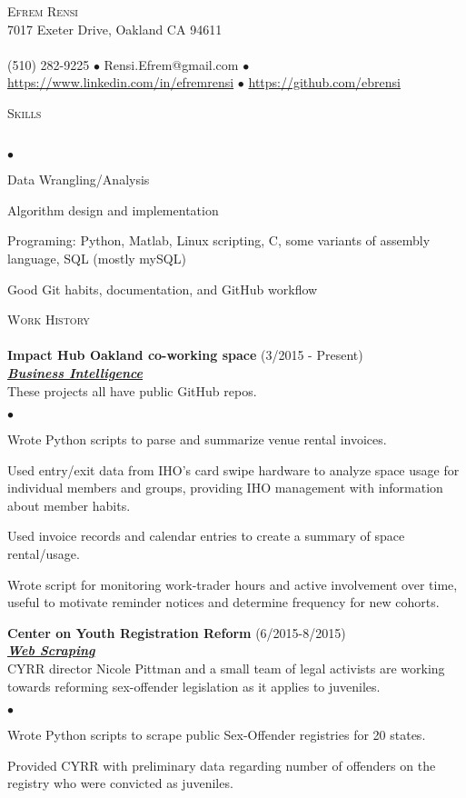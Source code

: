 \documentclass{article}
\newcommand{\lineunder}{\vspace*{-8pt} \\ \hspace*{-18pt} \hrulefill \\}
\newcommand{\header}[1]{{\hspace*{-15pt}\vspace*{6pt} \textsc{#1}} \vspace*{-6pt} \lineunder}
\newcommand{\employer}[3]{{ \textbf{#1} (#2)\\ \underline{\textbf{\emph{#3}}}\\  }}
\newcommand{\contact}[3]{
\vspace*{-8pt}
\begin{center}
{\LARGE \scshape {#1}}\\
#2 \lineunder
#3
\end{center}
\vspace*{-8pt}
}
\newenvironment{achievements}{\begin{list}{$\bullet$}{\topsep 0pt \itemsep -2pt}}{\vspace*{4pt}\end{list}}
\begin{document}
\small
\smallskip
\vspace*{-44pt}

\contact{Efrem Rensi}
{7017 Exeter Drive, Oakland CA 94611}
{(510) 282-9225 $\bullet$ Rensi.Efrem@gmail.com  $\bullet$ \url{https://www.linkedin.com/in/efremrensi}
$\bullet$ \url{https://github.com/ebrensi}
}
\bigskip

\medskip
\header{Skills}
\begin{achievements}
\item Data Wrangling/Analysis
\item Algorithm design and implementation
\item Programing: Python, Matlab, Linux scripting, C, some variants of assembly language, SQL (mostly mySQL)
\item Good Git habits, documentation, and GitHub workflow
\end{achievements}
\medskip

\header{Work History}
\employer{Impact Hub Oakland co-working space}{3/2015 - Present}{Business Intelligence}
These projects all have public GitHub repos.
\begin{achievements}
\item Wrote Python scripts to parse and summarize venue rental invoices. 
\item Used entry/exit data from IHO's card swipe hardware to analyze space usage for individual members and groups, providing IHO management with information about member habits.
\item Used invoice records and calendar entries to create a summary of space rental/usage.
\item Wrote script for monitoring work-trader hours and active involvement over time, useful to motivate reminder notices and determine frequency for new cohorts.
\end{achievements}

\employer{Center on Youth Registration Reform}{6/2015-8/2015}{Web Scraping} 
 CYRR director Nicole Pittman and a small team of legal activists are working towards reforming sex-offender legislation as it applies to juveniles.  
\begin{achievements}
\item Wrote Python scripts to scrape public Sex-Offender registries for 20 states.
\item Provided  CYRR with preliminary data regarding number of offenders on the registry who were convicted as juveniles. 
\end{achievements}
\end{document}
